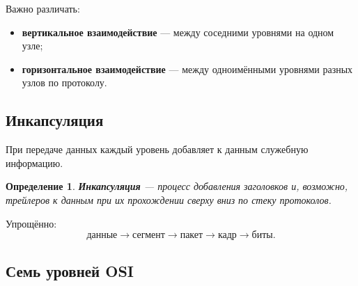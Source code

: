 \documentclass[12pt,a4paper]{article}
\newtheorem{definition}{Определение}
\begin{document}
Важно различать:
\begin{itemize}
    \item \textbf{вертикальное взаимодействие} --- между соседними уровнями на одном узле;
    \item \textbf{горизонтальное взаимодействие} --- между одноимёнными уровнями разных узлов по протоколу.
\end{itemize}

\subsection{Инкапсуляция}

При передаче данных каждый уровень добавляет к данным служебную информацию.

\begin{definition}
\textbf{Инкапсуляция} --- процесс добавления заголовков и, возможно, трейлеров к данным при их прохождении сверху вниз по стеку протоколов.
\end{definition}

Упрощённо:
\[
\text{данные}
\rightarrow
\text{сегмент}
\rightarrow
\text{пакет}
\rightarrow
\text{кадр}
\rightarrow
\text{биты}.
\]

\begin{center}
\end{center}

\subsection{Семь уровней OSI}
\end{document}
